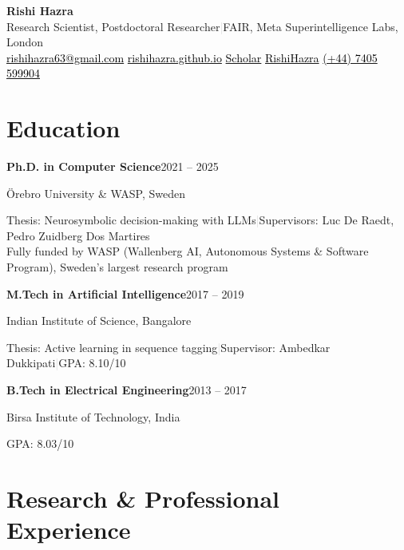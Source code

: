 \documentclass[a4paper,10pt]{article}
\newcommand{\cventry}[4]{%
  {\sffamily\bfseries #1}\hfill{\small\color{subtle}#3}\par\nopagebreak
  {\small\color{subtle}#2}\par\nopagebreak
  {\small #4}\par\vspace{0.6em}%
}
\newcommand{\cvcontact}[3]{\href{#3}{\textcolor{subtle}{#1}\;\textcolor{black}{#2}}}
\begin{document}
\begin{center}
  {\huge\bfseries Rishi Hazra}\\\vspace{0.3em}
  {\color{subtle}\normalsize Research Scientist, Postdoctoral Researcher\;\textcolor{lightgray}{|}\;FAIR, Meta Superintelligence Labs, London}\\\vspace{0.5em}
  \cvcontact{\faEnvelope}{rishihazra63@gmail.com}{mailto:rishihazra63@gmail.com}\quad
  \cvcontact{\faGlobe}{rishihazra.github.io}{https://rishihazra.github.io}\quad
  \cvcontact{\aiGoogleScholar}{Scholar}{https://scholar.google.com/citations?user=aWN72pEAAAAJ\&hl=en}\quad
  \cvcontact{\faGithub}{RishiHazra}{https://github.com/RishiHazra}\quad
  \cvcontact{\faPhone}{(+44) 7405 599904}{tel:+447405599904}
\end{center}

\vspace{-0.3em}

\section{Education}

\cventry{Ph.D. in Computer Science}{\"{O}rebro University \& WASP, Sweden}{2021 -- 2025}{%
  Thesis: Neurosymbolic decision-making with LLMs\;\textcolor{lightgray}{|}\;Supervisors: Luc De Raedt, Pedro Zuidberg Dos Martires\\
  Fully funded by WASP (Wallenberg AI, Autonomous Systems \& Software Program), Sweden's largest research program}

\cventry{M.Tech in Artificial Intelligence}{Indian Institute of Science, Bangalore}{2017 -- 2019}{%
  Thesis: Active learning in sequence tagging\;\textcolor{lightgray}{|}\;Supervisor: Ambedkar Dukkipati\;\textcolor{lightgray}{|}\;GPA: 8.10/10}

\cventry{B.Tech in Electrical Engineering}{Birsa Institute of Technology, India}{2013 -- 2017}{%
  GPA: 8.03/10}

\section{Research \& Professional Experience}
\end{document}

